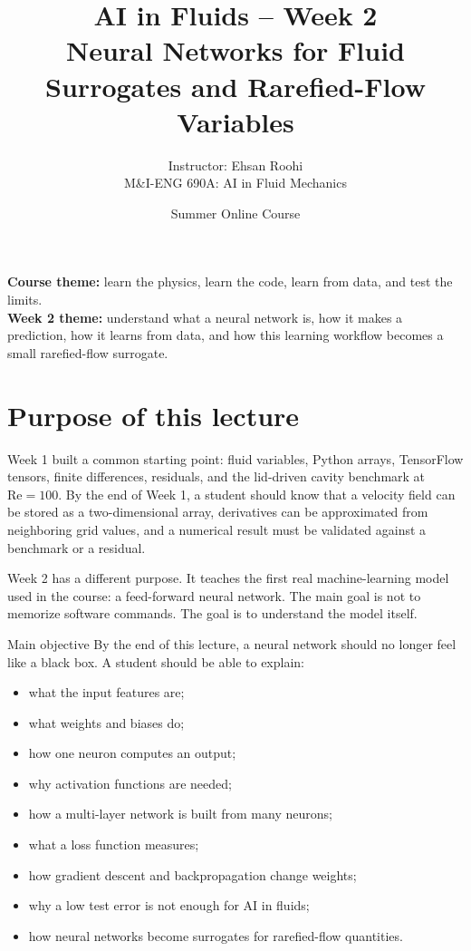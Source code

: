 \documentclass[11pt]{article}
\title{\textbf{AI in Fluids -- Week 2}\\[2mm]
Neural Networks for Fluid Surrogates and Rarefied-Flow Variables}
\author{Instructor: Ehsan Roohi\\M\&I-ENG 690A: AI in Fluid Mechanics}
\date{Summer Online Course}
\newcommand{\re}{\mathrm{Re}}
\begin{document}
\maketitle

\begin{center}
\begin{tcolorbox}[width=0.92\linewidth,colback=lightblue,colframe=fluidblue]
\textbf{Course theme:} learn the physics, learn the code, learn from data, and test the limits.\\[2pt]
\textbf{Week 2 theme:} understand what a neural network is, how it makes a prediction, how it learns from data, and how this learning workflow becomes a small rarefied-flow surrogate.
\end{tcolorbox}
\end{center}

\tableofcontents
\newpage

\section{Purpose of this lecture}

Week 1 built a common starting point: fluid variables, Python arrays, TensorFlow tensors, finite differences, residuals, and the lid-driven cavity benchmark at $\re=100$.  By the end of Week 1, a student should know that a velocity field can be stored as a two-dimensional array, derivatives can be approximated from neighboring grid values, and a numerical result must be validated against a benchmark or a residual.

Week 2 has a different purpose.  It teaches the first real machine-learning model used in the course: a feed-forward neural network.  The main goal is not to memorize software commands.  The goal is to understand the model itself.

\begin{keybox}{Main objective}
By the end of this lecture, a neural network should no longer feel like a black box.  A student should be able to explain:
\begin{itemize}
    \item what the input features are;
    \item what weights and biases do;
    \item how one neuron computes an output;
    \item why activation functions are needed;
    \item how a multi-layer network is built from many neurons;
    \item what a loss function measures;
    \item how gradient descent and backpropagation change weights;
    \item why a low test error is not enough for AI in fluids;
    \item how neural networks become surrogates for rarefied-flow quantities.
\end{itemize}
\end{keybox}
\end{document}
